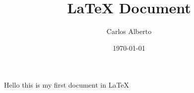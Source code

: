 \documentclass{article}
\title{LaTeX Document}
\author{Carlos Alberto}
\date{\today}
\begin{document}
    \maketitle
    Hello this is my first document in LaTeX
\end{document}
